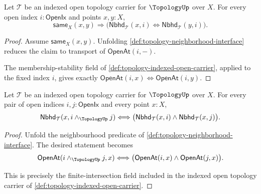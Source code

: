 \begin{theorem}
\label{thm:topology-neighborhood-classifier-transport}
Let $\mathcal{T}$ be an indexed open topology carrier for $\TopologyUp$ over $X$. For every open index $i:\mathsf{OpenIx}$ and points $x,y:X$,
$$
\mathsf{same}_X(x,y)
\Longrightarrow
\bigl(\mathsf{Nbhd}_{\mathcal{T}}(x,i)\Longleftrightarrow\mathsf{Nbhd}_{\mathcal{T}}(y,i)\bigr).
$$
\end{theorem}
\begin{proof}
Assume $\mathsf{same}_X(x,y)$. Unfolding \autoref{def:topology-neighborhood-interface} reduces the claim to transport of $\mathsf{OpenAt}(i,-)$.

The membership-stability field of \autoref{def:topology-indexed-open-carrier}, applied to the fixed index $i$, gives exactly $\mathsf{OpenAt}(i,x)\Longleftrightarrow\mathsf{OpenAt}(i,y)$.
\end{proof}

\begin{theorem}
\label{thm:topology-neighborhood-finite-intersection}
Let $\mathcal{T}$ be an indexed open topology carrier for $\TopologyUp$ over $X$. For every pair of open indices $i,j:\mathsf{OpenIx}$ and every point $x:X$,
$$
\mathsf{Nbhd}_{\mathcal{T}}(x,i\wedge_{\TopologyUp}j)
\Longleftrightarrow
\bigl(\mathsf{Nbhd}_{\mathcal{T}}(x,i)\wedge\mathsf{Nbhd}_{\mathcal{T}}(x,j)\bigr).
$$
\end{theorem}
\begin{proof}
Unfold the neighbourhood predicate of \autoref{def:topology-neighborhood-interface}. The desired statement becomes
$$
\mathsf{OpenAt}(i\wedge_{\TopologyUp}j,x)
\Longleftrightarrow
\bigl(\mathsf{OpenAt}(i,x)\wedge\mathsf{OpenAt}(j,x)\bigr).
$$

This is precisely the finite-intersection field included in the indexed open topology carrier of \autoref{def:topology-indexed-open-carrier}.
\end{proof}

